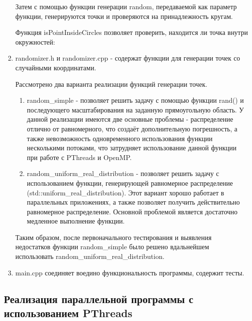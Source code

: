 \begin{enumerate}
Затем с помощью функции генерации random, передаваемой как параметр функции, генерируются точки и проверяются на принадлежность кругам.



Функция isPointInsideCircles позволяет проверить, находится ли точка внутри окружностей:



\item randomizer.h и randomizer.cpp - содержат функции для генерации точек со случайными координатами.

Рассмотрено два варианта реализации функций генерации точек.

\begin{enumerate}
	\item random\_simple - позволяет решить задачу с помощью функции rand() и последующего масштабирования на заданную прямоугольную область. У данной реализации имеются две основные проблемы - распределение отлично от равномерного, что создаёт дополнительную погрешность, а также невозможность одновременного использования функции несколькими потоками, что затрудняет использование данной функции при работе с PThreads и OpenMP.
			
	\item random\_uniform\_real\_distribution - позволяет решить задачу с использованием функции,  генерирующей равномерное распределение (std::uniform\_real\_distribution). Этот вариант хорошо работает в параллельных приложениях, а также позволяет получить действительно равномерное распределение. Основной проблемой является достаточно медленное выполнение функции.
	
\end{enumerate}

Таким образом, после первоначального тестирования и выявления недостатков функции random\_simple было решено вдальнейшем использовать random\_uniform\_real\_distribution.

\item main.cpp соединяет воедино функциональность программы, содержит тесты.

\end{enumerate}

\subsection{Реализация параллельной программы с использованием PThreads}

